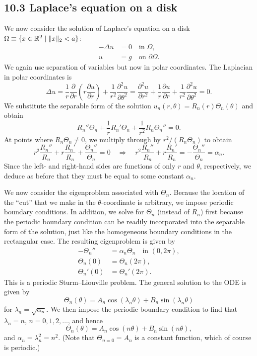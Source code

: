 \subsection{10.3 Laplace's equation on a disk}
We now consider the solution of Laplace's equation on a disk $\Omega \equiv \{x \in \mathbb{R}^2 \mid \|x\|_2 < a\}$:
\begin{equation*}
    \begin{aligned}
        -\Delta u &= 0 \quad \text{in } \Omega, \\
        u &= g \quad \text{on } \partial\Omega.
    \end{aligned} \tag{10.6}
\end{equation*}
We again use separation of variables but now in polar coordinates. The Laplacian in polar coordinates is
\[\Delta u = \frac{1}{r}\frac{\partial}{\partial r}\left(r\frac{\partial u}{\partial r}\right) + \frac{1}{r^2}\frac{\partial^2 u}{\partial\theta^2} = \frac{\partial^2 u}{\partial r^2} + \frac{1}{r}\frac{\partial u}{\partial r} + \frac{1}{r^2}\frac{\partial^2 u}{\partial\theta^2} = 0.\]
We substitute the separable form of the solution $u_n(r, \theta) = R_n(r)\Theta_n(\theta)$ and obtain
\[R_n''\Theta_n + \frac{1}{r}R_n'\Theta_n + \frac{1}{r^2}R_n\Theta_n'' = 0.\]
At points where $R_n\Theta_n \neq 0$, we multiply through by $r^2/(R_n\Theta_n)$ to obtain
\[r^2\frac{R_n''}{R_n} + r\frac{R_n'}{R_n} + \frac{\Theta_n''}{\Theta_n} = 0 \quad \Rightarrow \quad r^2\frac{R_n''}{R_n} + r\frac{R_n'}{R_n} = -\frac{\Theta_n''}{\Theta_n} = \alpha_n.\]
Since the left- and right-hand sides are functions of only $r$ and $\theta$, respectively, we deduce as before that they must be equal to some constant $\alpha_n$.

We now consider the eigenproblem associated with $\Theta_n$. Because the location of the ``cut'' that we make in the $\theta$-coordinate is arbitrary, we impose periodic boundary conditions. In addition, we solve for $\Theta_n$ (instead of $R_n$) first because the periodic boundary condition can be readily incorporated into the separable form of the solution, just like the homogeneous boundary conditions in the rectangular case. The resulting eigenproblem is given by
\begin{align*}
    -\Theta_n'' &= \alpha_n\Theta_n \quad \text{in } (0, 2\pi), \\
    \Theta_n(0) &= \Theta_n(2\pi), \\
    \Theta_n'(0) &= \Theta_n'(2\pi).
\end{align*}
This is a periodic Sturm--Liouville problem. The general solution to the ODE is given by
\[\Theta_n(\theta) = A_n\cos(\lambda_n\theta) + B_n\sin(\lambda_n\theta)\]
for $\lambda_n = \sqrt{\alpha_n}$. We then impose the periodic boundary condition to find that $\lambda_n = n$, $n = 0, 1, 2, \dots$, and hence
\[\Theta_n(\theta) = A_n\cos(n\theta) + B_n\sin(n\theta),\]
and $\alpha_n = \lambda_n^2 = n^2$. (Note that $\Theta_{n=0} = A_n$ is a constant function, which of course is periodic.)

